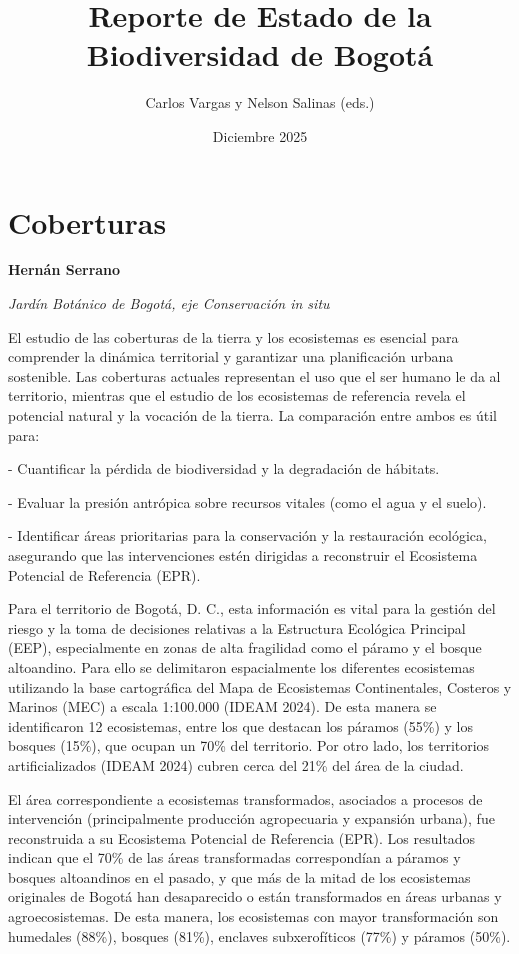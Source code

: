 \documentclass{article}
\title{Reporte de Estado de la Biodiversidad de Bogotá}
\date{Diciembre 2025}
\author{Carlos Vargas y Nelson Salinas (eds.)}
\begin{document}
\maketitle

\section*{Coberturas}

\noindent \textbf{\large Hernán Serrano}

\noindent \emph{Jardín Botánico de Bogotá, eje Conservación \emph{in situ}}

\bigskip

			
El estudio de las coberturas de la tierra y los ecosistemas es esencial para comprender la dinámica territorial y garantizar una planificación urbana sostenible. Las coberturas actuales representan el uso que el ser humano le da al territorio, mientras que el estudio de los ecosistemas de referencia revela el potencial natural y la vocación de la tierra. La comparación entre ambos es útil para:
			
- Cuantificar la pérdida de biodiversidad y la degradación de hábitats.

- Evaluar la presión antrópica sobre recursos vitales (como el agua y el suelo).

- Identificar áreas prioritarias para la conservación y la restauración ecológica, asegurando que las intervenciones estén dirigidas a reconstruir el Ecosistema Potencial de Referencia (EPR).

Para el territorio de Bogotá, D. C., esta información es vital para la gestión del riesgo y la toma de decisiones relativas a la Estructura Ecológica Principal (EEP), especialmente en zonas de alta fragilidad como el páramo y el bosque altoandino. Para ello se delimitaron espacialmente los diferentes ecosistemas utilizando la base cartográfica del Mapa de Ecosistemas Continentales, Costeros y Marinos (MEC) a escala 1:100.000 (IDEAM 2024). De esta manera se identificaron 12 ecosistemas, entre los que destacan los páramos (55\%) y los bosques (15\%), que ocupan un 70\% del territorio. Por otro lado, los territorios artificializados (IDEAM 2024) cubren cerca del 21\% del área de la ciudad. 

El área correspondiente a ecosistemas transformados, asociados a procesos de intervención (principalmente producción agropecuaria y expansión urbana), fue reconstruida a su Ecosistema Potencial de Referencia (EPR). Los resultados indican que el 70\% de las áreas transformadas correspondían a páramos y bosques altoandinos en el pasado, y que más de la mitad de los ecosistemas originales de Bogotá han desaparecido o están transformados en áreas urbanas y agroecosistemas. De esta manera, los ecosistemas con mayor transformación son humedales (88\%), bosques (81\%), enclaves subxerofíticos (77\%) y páramos (50\%).
\end{document}
